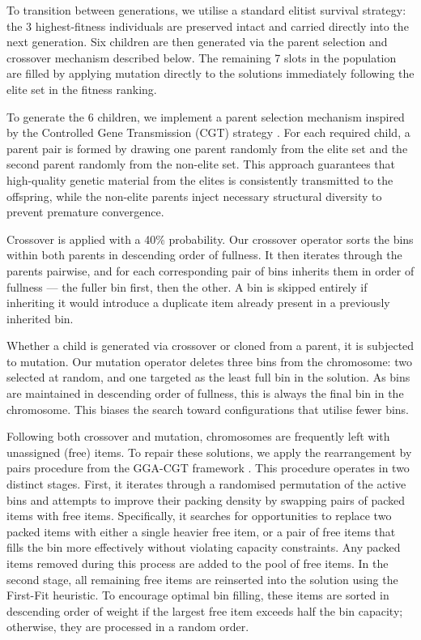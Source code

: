 \documentclass[11pt]{article}
\begin{document}
To transition between generations, we utilise a standard elitist survival 
strategy: the 3 highest-fitness individuals are preserved intact and carried 
directly into the next generation. Six children are then generated via the 
parent selection and crossover mechanism described below. The remaining 7 
slots in the population are filled by applying mutation directly to the 
solutions immediately following the elite set in the fitness ranking.

To generate the 6 children, we implement a parent selection mechanism 
inspired by the Controlled Gene Transmission (CGT) strategy \cite{quirozca}. 
For each required child, a parent pair is formed by drawing one parent 
randomly from the elite set and the second parent randomly from the non-elite 
set. This approach guarantees that high-quality genetic material from the 
elites is consistently transmitted to the offspring, while the non-elite 
parents inject necessary structural diversity to prevent premature 
convergence.

Crossover is applied with a 40\% probability. Our crossover operator sorts 
the bins within both parents in descending order of fullness. It then 
iterates through the parents pairwise, and for each corresponding pair of 
bins inherits them in order of fullness --- the fuller bin first, then the 
other. A bin is skipped entirely if inheriting it would introduce a duplicate 
item already present in a previously inherited bin.

Whether a child is generated via crossover or cloned from a parent, it is 
subjected to mutation. Our mutation operator deletes three bins from the 
chromosome: two selected at random, and one targeted as the least full bin 
in the solution. As bins are maintained in descending order of fullness, 
this is always the final bin in the chromosome. This biases the search toward configurations that utilise 
fewer bins.

Following both crossover and mutation, chromosomes are frequently left with 
unassigned (free) items. To repair these solutions, we apply the rearrangement 
by pairs procedure from the GGA-CGT framework \cite{quirozca}. This procedure 
operates in two distinct stages. First, it iterates through a randomised 
permutation of the active bins and attempts to improve their packing density 
by swapping pairs of packed items with free items. Specifically, it searches 
for opportunities to replace two packed items with either a single heavier 
free item, or a pair of free items that fills the bin more effectively without 
violating capacity constraints. Any packed items removed during this process 
are added to the pool of free items. In the second stage, all remaining free 
items are reinserted into the solution using the First-Fit heuristic. To 
encourage optimal bin filling, these items are sorted in descending order of 
weight if the largest free item exceeds half the bin capacity; otherwise, they 
are processed in a random order.
\end{document}
